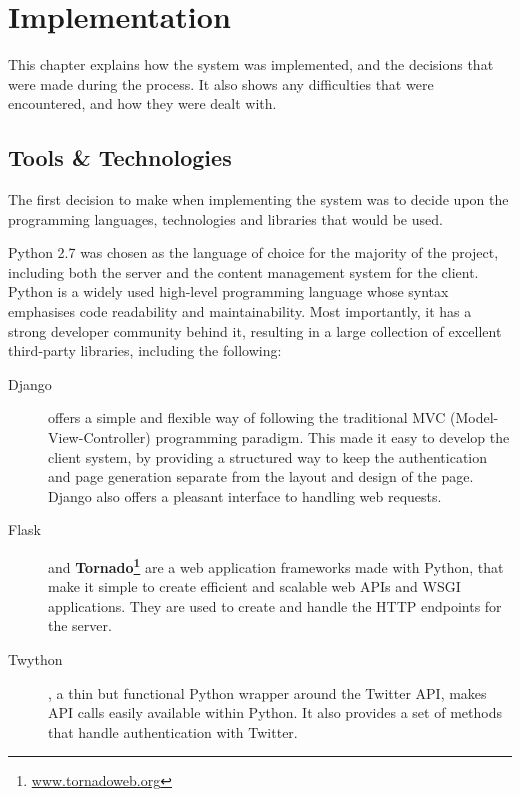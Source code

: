 \documentclass[11pt,a4paper]{report}
\begin{document}
\pagebreak

\chapter{Implementation}
\label{chap:implementation}

This chapter explains how the system was implemented, and the decisions that were made during the process. It also shows any difficulties that were encountered, and how they were dealt with.

\section{Tools \& Technologies}
The first decision to make when implementing the system was to decide upon the programming languages, technologies and libraries that would be used.

Python 2.7 was chosen as the language of choice for the majority of the project, including both the server and the content management system for the client. Python is a widely used high-level programming language whose syntax emphasises code readability and maintainability. Most importantly, it has a strong developer community behind it, resulting in a large collection of excellent third-party libraries, including the following:

\begin{description}
    \item[Django\footnotemark] offers a simple and flexible way of following the traditional MVC (Model-View-Controller) programming paradigm. This made it easy to develop the client system, by providing a structured way to keep the authentication and page generation separate from the layout and design of the page. Django also offers a pleasant interface to handling web requests.
    \item[Flask\footnotemark] and \textbf{Tornado\footnote{\url{www.tornadoweb.org}}} are a web application frameworks made with Python, that make it simple to create efficient and scalable web APIs and WSGI applications. They are used to create and handle the HTTP endpoints for the server.
    \item[Twython\footnotemark], a thin but functional Python wrapper around the Twitter API, makes API calls easily available within Python. It also provides a set of methods that handle authentication with Twitter.
\end{description}
\end{document}
